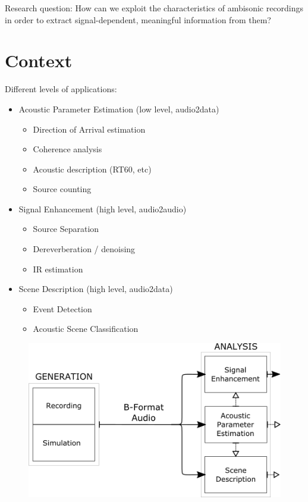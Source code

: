 Research question: 	How can we exploit the characteristics of ambisonic recordings in order to extract signal-dependent, meaningful information from them? 


\section{Context}
\label{sec:context}

Different levels of applications:

\begin{itemize}
	\item Acoustic Parameter Estimation (low level, audio2data)
	\begin{itemize}
		\item Direction of Arrival estimation
		\item Coherence analysis
		\item Acoustic description (RT60, etc)
		\item Source counting
	\end{itemize}

	\item Signal Enhancement  (high level, audio2audio)
	\begin{itemize}
		\item Source Separation
		\item Dereverberation / denoising
		\item IR estimation
	\end{itemize}

	\item Scene Description (high level, audio2data)
	\begin{itemize}
		\item Event Detection
		\item Acoustic Scene Classification
	\end{itemize}
\end{itemize}

\begin{figure}[hbt]
  \includegraphics[width=\textwidth]{Figures/Introduction/SCHEME1.png}
  \caption{}
  \label{fig:scheme1}
\end{figure}


